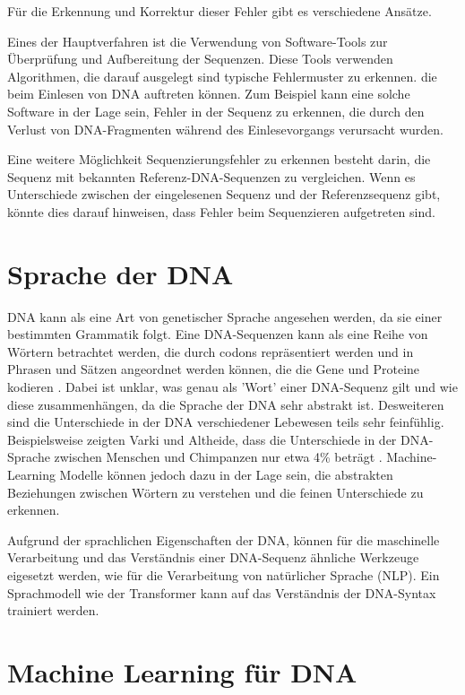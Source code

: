 \documentclass[oneside,bibliography=totocnumbered,BCOR=5mm]{scrbook}%
\theoremstyle{definition}
\theoremstyle{definition}
\theoremstyle{definition}
\theoremstyle{definition}
\theoremstyle{definition}
\theoremstyle{definition}
\begin{document}
Für die Erkennung und Korrektur dieser Fehler gibt es verschiedene Ansätze. 


Eines der Hauptverfahren ist die Verwendung von Software-Tools zur Überprüfung und Aufbereitung der Sequenzen. 
Diese Tools verwenden Algorithmen, die darauf ausgelegt sind typische Fehlermuster zu erkennen. 
die beim Einlesen von DNA auftreten können. 
Zum Beispiel kann eine solche Software in der Lage sein, Fehler in der Sequenz zu erkennen, 
die durch den Verlust von DNA-Fragmenten während des Einlesevorgangs verursacht wurden.


Eine weitere Möglichkeit Sequenzierungsfehler zu erkennen
besteht darin, die Sequenz mit bekannten Referenz-DNA-Sequenzen zu vergleichen.
Wenn es Unterschiede zwischen der eingelesenen Sequenz und der Referenzsequenz gibt, 
könnte dies darauf hinweisen, dass Fehler beim Sequenzieren aufgetreten sind.


\section{Sprache der DNA}


DNA kann als eine Art von genetischer Sprache angesehen werden, da sie einer bestimmten Grammatik folgt. 
Eine DNA-Sequenzen kann als eine Reihe von Wörtern betrachtet werden, 
die durch codons repräsentiert werden und in Phrasen und Sätzen angeordnet werden können, 
die die Gene und Proteine kodieren \autocite[Seite 584]{dnalinguistic}. Dabei ist unklar, 
was genau als 'Wort' einer DNA-Sequenz gilt und wie diese zusammenhängen, da die Sprache der 
DNA sehr abstrakt ist. Desweiteren sind die Unterschiede in der DNA verschiedener Lebewesen
teils sehr feinfühlig. Beispielsweise zeigten Varki und Altheide, dass die Unterschiede in
der DNA-Sprache zwischen Menschen und Chimpanzen nur etwa 4\% beträgt \autocite[Seite 1748]{genomeDifference}.
Machine-Learning Modelle können jedoch dazu in der Lage sein, die abstrakten 
Beziehungen zwischen Wörtern zu verstehen und die feinen Unterschiede zu erkennen.


Aufgrund der sprachlichen Eigenschaften der DNA, können für die maschinelle Verarbeitung und das Verständnis
einer DNA-Sequenz ähnliche Werkzeuge eigesetzt werden, wie für die Verarbeitung von natürlicher Sprache (NLP).
Ein Sprachmodell wie der Transformer kann auf das Verständnis der DNA-Syntax trainiert werden.

\section{Machine Learning für DNA}
\end{document}
